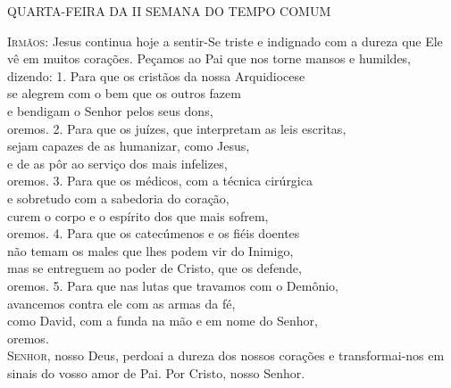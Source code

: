 \documentclass{book}
\begin{document}
\pagestyle{empty}
\begin{center}
    \large{QUARTA-FEIRA DA II SEMANA DO TEMPO COMUM}
    \vspace{.2cm} \\
\end{center}
\lettrine[findent=2pt]{\color{VioletRed1}I}{rmãos}:
\newline
Jesus continua hoje a sentir-Se triste e indignado
\newline
com a dureza que Ele vê em muitos corações.
\newline
Peçamos ao Pai que nos torne mansos e humildes, dizendo:
\vspace{.2cm}
\newline
{}
\vspace{.2cm}
\newline
{\color{VioletRed1} 1.} Para que os cristãos da nossa Arquidiocese\\
se alegrem com o bem que os outros fazem\\
e bendigam o Senhor pelos seus dons,\\
oremos.
\vspace{.1cm}
\newline
{\color{VioletRed1} 2.} Para que os juízes, que interpretam as leis escritas,\\
sejam capazes de as humanizar, como Jesus,\\
e de as pôr ao serviço dos mais infelizes,\\
oremos.
\vspace{.1cm}
\newline
{\color{VioletRed1} 3.} Para que os médicos, com a técnica cirúrgica\\
e sobretudo com a sabedoria do coração,\\
curem o corpo e o espírito dos que mais sofrem,\\
oremos.
\vspace{.1cm}
\newline
{\color{VioletRed1} 4.} Para que os catecúmenos e os fiéis doentes\\
não temam os males que lhes podem vir do Inimigo,\\
mas se entreguem ao poder de Cristo, que os defende,\\
oremos.
\vspace{.1cm}
\newline
{\color{VioletRed1} 5.} Para que nas lutas que travamos com o Demônio,\\
avancemos contra ele com as armas da fé,\\
como David, com a funda na mão e em nome do Senhor,\\
oremos.
\vspace{.1cm} \\
\lettrine[findent=2pt]{\color{VioletRed1}S}{enhor}, nosso Deus,
\newline
perdoai a dureza dos nossos corações
\newline
e transformai-nos em sinais do vosso amor de Pai.
\newline
Por Cristo, nosso Senhor.
\newline
{}
\end{document}
